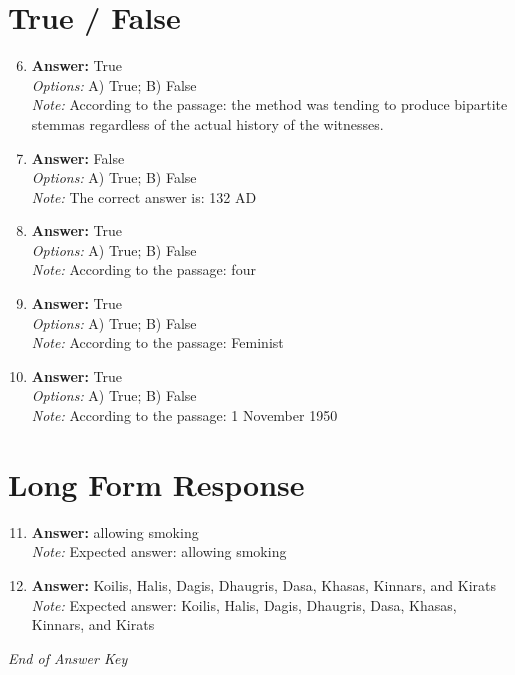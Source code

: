 \documentclass[12pt]{article}
\begin{document}
\section*{True / False}
\begin{enumerate}[label=\arabic*.]
\setcounter{enumi}{5}
\item \textbf{Answer:} True
\\ \textit{Options:} A) True; B) False
\\ \textit{Note:} According to the passage: the method was tending to produce bipartite stemmas regardless of the actual history of the witnesses.
\item \textbf{Answer:} False
\\ \textit{Options:} A) True; B) False
\\ \textit{Note:} The correct answer is: 132 AD
\item \textbf{Answer:} True
\\ \textit{Options:} A) True; B) False
\\ \textit{Note:} According to the passage: four
\item \textbf{Answer:} True
\\ \textit{Options:} A) True; B) False
\\ \textit{Note:} According to the passage: Feminist
\item \textbf{Answer:} True
\\ \textit{Options:} A) True; B) False
\\ \textit{Note:} According to the passage: 1 November 1950
\end{enumerate}

\section*{Long Form Response}
\begin{enumerate}[label=\arabic*.]
\setcounter{enumi}{10}
\item \textbf{Answer:} allowing smoking
\\ \textit{Note:} Expected answer: allowing smoking
\item \textbf{Answer:} Koilis, Halis, Dagis, Dhaugris, Dasa, Khasas, Kinnars, and Kirats
\\ \textit{Note:} Expected answer: Koilis, Halis, Dagis, Dhaugris, Dasa, Khasas, Kinnars, and Kirats
\end{enumerate}

\vfill
\noindent\textit{End of Answer Key}
\end{document}
